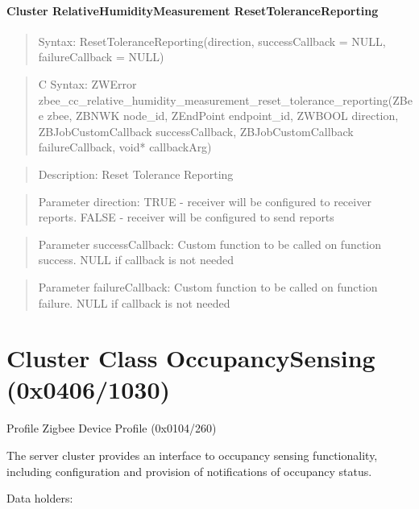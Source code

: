 \paragraph{Cluster RelativeHumidityMeasurement ResetToleranceReporting}
\begin{quote}Syntax: ResetToleranceReporting(direction, successCallback = NULL, failureCallback = NULL)\end{quote}
\begin{quote}C Syntax: ZWError zbee\_cc\_relative\_humidity\_measurement\_reset\_tolerance\_reporting(ZBee zbee, ZBNWK node\_id, ZEndPoint endpoint\_id, ZWBOOL direction, ZBJobCustomCallback successCallback, ZBJobCustomCallback failureCallback, void* callbackArg)\end{quote}
\begin{quote}Description: Reset Tolerance Reporting\end{quote}
\begin{quote}Parameter direction: TRUE  - receiver will be configured to receiver reports. FALSE - receiver will be configured to send reports\end{quote}
\begin{quote}Parameter successCallback: Custom function to be called on function success. NULL if callback is not needed\end{quote}
\begin{quote}Parameter failureCallback: Custom function to be called on function failure. NULL if callback is not needed\end{quote}



\section{Cluster Class OccupancySensing (0x0406/1030)}

Profile Zigbee Device Profile (0x0104/260)

The server cluster provides an interface to occupancy sensing functionality, including configuration and provision of notifications of occupancy status.
\newline

\noindent
Data holders:


